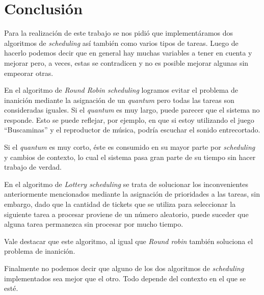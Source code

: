 \section{Conclusión}

Para la realización de este trabajo se nos pidió que implementáramos dos algoritmos de \textit{scheduling} así también como varios tipos de tareas.
Luego de hacerlo podemos decir que en general hay muchas variables a tener en cuenta y mejorar pero, a veces, estas se contradicen y no es posible mejorar algunas sin empeorar otras.

En el algoritmo de \textit{Round Robin scheduling} logramos evitar el problema de inanición mediante la asignación de un \textit{quantum} pero todas las tareas son consideradas iguales. Si el \textit{quantum} es muy largo, puede parecer que el sistema no responde. Esto se puede reflejar, por ejemplo, en que si estoy utilizando el juego ``Buscaminas'' y el reproductor de música, podría escuchar el sonido entrecortado.

Si el \textit{quantum} es muy corto, éste es consumido en su mayor parte por \textit{scheduling} y cambios de contexto, lo cual el sistema pasa gran parte de su tiempo sin hacer trabajo de verdad.

En el algoritmo de \textit{Lottery scheduling} se trata de solucionar los inconvenientes anteriormente mencionados mediante la asignación de prioridades a las tareas, sin embargo, dado que la cantidad de tickets que se utiliza para seleccionar la siguiente tarea a procesar proviene de un número aleatorio, puede suceder que alguna tarea permanezca sin procesar por mucho tiempo.

Vale destacar que este algoritmo, al igual que \textit{Round robin} también soluciona el problema de inanición.

Finalmente no podemos decir que alguno de los dos algoritmos de \textit{scheduling} implementados sea mejor que el otro. Todo depende del contexto en el que se esté.

 